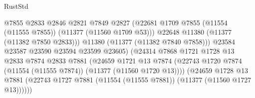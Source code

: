\begin{lexlean}{RustStd}
\begin{coremodule}
                                              @7855
                                              @2833
                                              @2846
                                              @2821
                                              @7849
                                              @2827
                                              (@22681
                                                @1709
                                                @7855
                                                (@11554 (@11555 @7855))
                                                (@11377 (@11560 @1709 @53)))
                                              @22648
                                              @11380
                                              (@11377 (@11382 @7850 @2833)))
                                            @11380
                                            (@11377 (@11382 @7840 @7858)))
                                          @23584
                                          @23587
                                          @23590
                                          @23594
                                          @23599
                                          @23605)
                                        (@24314
                                          @7868
                                          @1721
                                          @1728
                                          @13
                                          @2833
                                          @7874
                                          @2833
                                          @7881
                                          (@24659
                                            @1721
                                            @13
                                            @7874
                                            (@22743
                                              @1720
                                              @7874
                                              (@11554 (@11555 @7874))
                                              (@11377 (@11560 @1720 @13))))
                                          (@24659
                                            @1728
                                            @13
                                            @7881
                                            (@22743
                                              @1727
                                              @7881
                                              (@11554 (@11555 @7881))
                                              (@11377 (@11560 @1727 @13))))))

\end{coremodule}
\end{lexlean}
